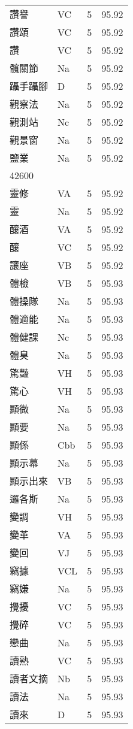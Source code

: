 \documentclass[twocolumn]{book}
\begin{document}
\begin{supertabular}{llrr}
讚譽 & VC & 5 &  95.92\\
讚頌 & VC & 5 &  95.92\\
讚 & VC & 5 &  95.92\\
髖關節 & Na & 5 &  95.92\\
躡手躡腳 & D & 5 &  95.92\\
觀察法 & Na & 5 &  95.92\\
觀測站 & Nc & 5 &  95.92\\
觀景窗 & Na & 5 &  95.92\\
鹽業 & Na & 5 &  95.92\\
42600\\
靈修 & VA & 5 &  95.92\\
靈 & Na & 5 &  95.92\\
釀酒 & VA & 5 &  95.92\\
釀 & VC & 5 &  95.92\\
讓座 & VB & 5 &  95.92\\
體檢 & VB & 5 &  95.93\\
體操隊 & Na & 5 &  95.93\\
體適能 & Na & 5 &  95.93\\
體健課 & Nc & 5 &  95.93\\
體臭 & Na & 5 &  95.93\\
驚豔 & VH & 5 &  95.93\\
驚心 & VH & 5 &  95.93\\
顯微 & Na & 5 &  95.93\\
顯要 & Na & 5 &  95.93\\
顯係 & Cbb & 5 &  95.93\\
顯示幕 & Na & 5 &  95.93\\
顯示出來 & VB & 5 &  95.93\\
邏各斯 & Na & 5 &  95.93\\
變調 & VH & 5 &  95.93\\
變革 & VA & 5 &  95.93\\
變回 & VJ & 5 &  95.93\\
竊據 & VCL & 5 &  95.93\\
竊嫌 & Na & 5 &  95.93\\
攪擾 & VC & 5 &  95.93\\
攪碎 & VC & 5 &  95.93\\
戀曲 & Na & 5 &  95.93\\
讀熟 & VC & 5 &  95.93\\
讀者文摘 & Nb & 5 &  95.93\\
讀法 & Na & 5 &  95.93\\
讀來 & D & 5 &  95.93\\

\end{supertabular}
\end{document}
